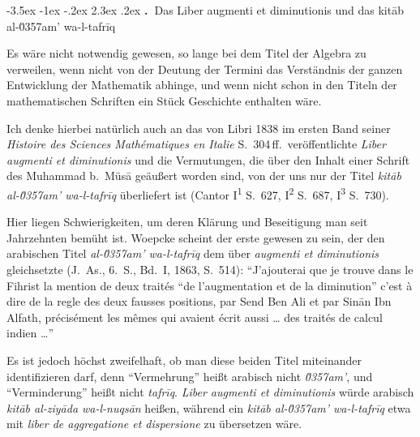 \documentclass[11pt,a4paper]{article}
\makeatletter
\renewcommand{\section}{\@startsection{section}{1}{\z@}%
  {-3.5ex \@plus -1ex \@minus -.2ex}%
  {2.3ex \@plus .2ex}%
  {\normalfont\Large\bfseries\color{sectioncolor}\thesection.\ }}
\newcommand{\enquote}[1]{``#1''}
\makeatother
\begin{document}
\clearpage

\section{Das Liber augmenti et diminutionis und das kit\=ab al-\u0357{}am' wa-l-tafr\={i}q}

Es w\"are nicht notwendig gewesen, so lange bei dem Titel der Algebra zu verweilen, wenn nicht von der Deutung der Termini das Verst\"andnis der ganzen Entwicklung der Mathematik abhinge, und wenn nicht schon in den Titeln der mathematischen Schriften ein St\"uck Geschichte enthalten w\"are.

Ich denke hierbei nat\"urlich auch an das von Libri 1838 im ersten Band seiner \textit{Histoire des Sciences Math\'ematiques en Italie} S.\ 304\,ff.\ ver\"offentlichte \textit{Liber augmenti et diminutionis} und die Vermutungen, die \"uber den Inhalt einer Schrift des Muhammad b.\ M\"us\=a ge\"au\ss{}ert worden sind, von der uns nur der Titel \textit{kit\=ab al-\u0357{}am' wa-l-tafr\={i}q} \"uberliefert ist (Cantor I\textsuperscript{1} S.\ 627, I\textsuperscript{2} S.\ 687, I\textsuperscript{3} S.\ 730).

Hier liegen Schwierigkeiten, um deren Kl\"arung und Beseitigung man seit Jahrzehnten bem\"uht ist. Woepcke scheint der erste gewesen zu sein, der den arabischen Titel \textit{al-\u0357{}am' wa-l-tafr\={i}q} dem \"uber \textit{augmenti et diminutionis} gleichsetzte (J.\ As., 6.\ S., Bd.\ I, 1863, S.\ 514): \enquote{J'ajouterai que je trouve dans le Fihrist la mention de deux trait\'es \enquote{de l'augmentation et de la diminution} c'est \`a dire de la regle des deux fausses positions, par Send Ben Ali et par Sin\=an Ibn Alfath, pr\'ecis\'ement les m\^emes qui avaient \'ecrit aussi \ldots{} des trait\'es de calcul indien \ldots{}}

Es ist jedoch h\"ochst zweifelhaft, ob man diese beiden Titel miteinander identifizieren darf, denn \enquote{Vermehrung} hei\ss{}t arabisch nicht \textit{\u0357{}am'}, und \enquote{Verminderung} hei\ss{}t nicht \textit{tafr\={i}q}. \textit{Liber augmenti et diminutionis} w\"urde arabisch \textit{kit\=ab al-ziy\=ada wa-l-nuqs\=an} hei\ss{}en, w\"ahrend ein \textit{kit\=ab al-\u0357{}am' wa-l-tafr\={i}q} etwa mit \textit{liber de aggregatione et dispersione} zu \"ubersetzen w\"are.
\end{document}
